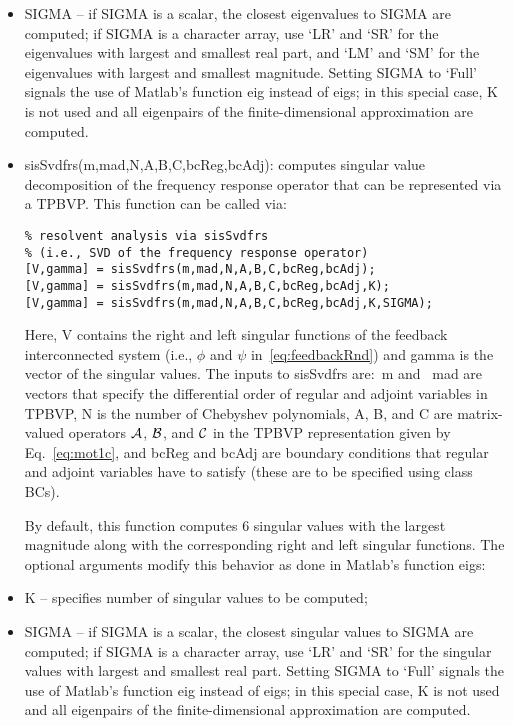 \documentclass[%
secnumarabic,%
 amssymb, amsmath,%
 aps,prf,superscriptaddress,longbibliography
frontmatterverbose,
]{revtex4-2}
\begin{document}
\begin{itemize}
   \item {\sf SIGMA} -- if {\sf SIGMA} is a scalar, the closest eigenvalues to {\sf SIGMA} are computed; if {\sf SIGMA} is a character array, use `LR' and `SR' for the eigenvalues with largest and smallest real part, and `LM' and `SM' for the eigenvalues with largest and smallest magnitude.
   \ei
  Setting {\sf SIGMA} to {\sf `Full'} signals the use of Matlab's function {\sf eig} instead of {\sf eigs}; in this special case,
  {\sf K} is not used and all eigenpairs of the finite-dimensional approximation are computed.
  \item {\sf sisSvdfrs(m,mad,N,A,B,C,bcReg,bcAdj):} computes singular value decomposition of the frequency response operator that can be represented via a TPBVP. This function can be called via:   
\begin{lstlisting} 
% resolvent analysis via sisSvdfrs
% (i.e., SVD of the frequency response operator) 
[V,gamma] = sisSvdfrs(m,mad,N,A,B,C,bcReg,bcAdj);
[V,gamma] = sisSvdfrs(m,mad,N,A,B,C,bcReg,bcAdj,K);
[V,gamma] = sisSvdfrs(m,mad,N,A,B,C,bcReg,bcAdj,K,SIGMA);
\end{lstlisting}   
Here, {\sf V} contains the right and left singular functions of the feedback interconnected system (i.e., $\phi$ and $\psi$ in~\eqref{eq:feedbackRnd}) and {\sf gamma} is the vector of the singular values. The inputs to {\sf sisSvdfrs} are:~{\sf m} and ~{\sf mad} are vectors that specify the differential order of regular and adjoint variables in TPBVP, {\sf N} is the number of Chebyshev polynomials, {\sf A}, {\sf B}, and {\sf C} are matrix-valued operators $\mathcal{A}$, $\mathcal{B}$, and $\mathcal{C}$ in the TPBVP representation given by Eq.~\eqref{eq:mot1c}, and {\sf bcReg} and {\sf bcAdj} are boundary conditions that regular and adjoint variables have to satisfy (these are to be specified using class {\sf BCs}).  

  By default, this function computes 6 singular values with the largest magnitude along with the corresponding right and left singular functions. The optional arguments modify this behavior as done in Matlab's function {\sf eigs}: 
  \bi
\item {\sf K} -- specifies number of singular values to be computed;

\item {\sf SIGMA} -- if {\sf SIGMA} is a scalar, the closest singular values to {\sf SIGMA} are computed; if {\sf SIGMA} is a character array, use `LR' and `SR' for the singular values with largest and smallest real part.
\ei
Setting {\sf SIGMA} to {\sf `Full'} signals the use of Matlab's function {\sf eig} instead of {\sf eigs}; in this special case,
{\sf K} is not used and all eigenpairs of the finite-dimensional approximation are computed.
      

\end{itemize}
\end{document}

